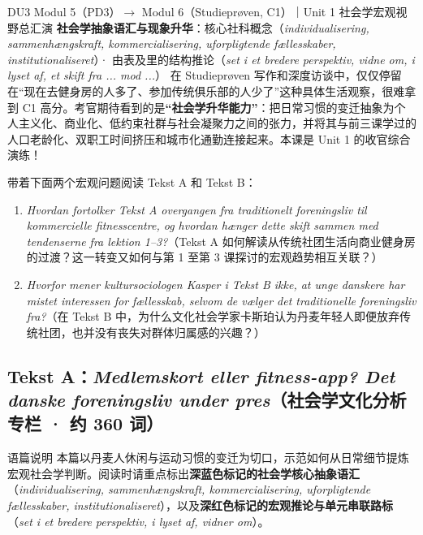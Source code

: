{DU3 Modul 5（PD3）$\rightarrow$ Modul 6（Studieprøven, C1）｜Unit 1 社会学宏观视野总汇演}
{\textbf{社会学抽象语汇与现象升华}：核心社科概念（\textit{individualisering, sammenhængskraft, kommercialisering, uforpligtende fællesskaber, institutionaliseret}）· 由表及里的结构推论（\textit{set i et bredere perspektiv, vidne om, i lyset af, et skift fra ... mod ...}）}
{在 Studieprøven 写作和深度访谈中，仅仅停留在“现在去健身房的人多了、参加传统俱乐部的人少了”这种具体生活观察，很难拿到 C1 高分。考官期待看到的是\textbf{“社会学升华能力”}：把日常习惯的变迁抽象为个人主义化、商业化、低约束社群与社会凝聚力之间的张力，并将其与前三课学过的人口老龄化、双职工时间挤压和城市化通勤连接起来。本课是 Unit 1 的收官综合演练！}

\begin{foerduleaeser}
带着下面两个宏观问题阅读 Tekst A 和 Tekst B：
\begin{enumerate}
  \item \textit{Hvordan fortolker Tekst A overgangen fra traditionelt foreningsliv til kommercielle fitnesscentre, og hvordan hænger dette skift sammen med tendenserne fra lektion 1--3?}（Tekst A 如何解读从传统社团生活向商业健身房的过渡？这一转变又如何与第 1 至第 3 课探讨的宏观趋势相互关联？）
  \item \textit{Hvorfor mener kultursociologen Kasper i Tekst B ikke, at unge danskere har mistet interessen for fællesskab, selvom de vælger det traditionelle foreningsliv fra?}（在 Tekst B 中，为什么文化社会学家卡斯珀认为丹麦年轻人即便放弃传统社团，也并没有丧失对群体归属感的兴趣？）
\end{enumerate}
\end{foerduleaeser}


\subsection*{Tekst A：\textit{Medlemskort eller fitness-app? Det danske foreningsliv under pres}（社会学文化分析专栏 · 约 360 词）}

\begin{tipbox}{语篇说明}
本篇以丹麦人休闲与运动习惯的变迁为切口，示范如何从日常细节提炼宏观社会学判断。阅读时请重点标出\textbf{\color{NCDNavy}深蓝色标记的社会学核心抽象语汇}（\textit{individualisering, sammenhængskraft, kommercialisering, uforpligtende fællesskaber, institutionaliseret}），以及\textbf{\color{NCDRed}深红色标记的宏观推论与单元串联路标}（\textit{set i et bredere perspektiv, i lyset af, vidner om}）。
\end{tipbox}

